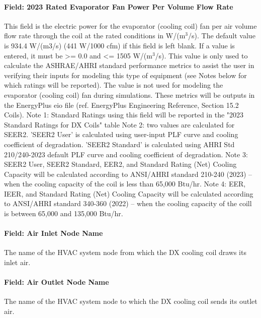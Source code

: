 \paragraph{Field: 2023 Rated Evaporator Fan Power Per Volume Flow Rate}

This field is the electric power for the evaporator (cooling coil) fan per air volume flow rate through the coil at the rated conditions in W/(m\(^{3}\)/s). The default value is 934.4 W/(m3/s) (441 W/1000 cfm) if this field is left blank. If a value is entered, it must be \textgreater{}= 0.0 and \textless{}= 1505 W/(m\(^{3}\)/s). This value is only used to calculate the ASHRAE/AHRI standard performance metrics to assist the user in verifying their inputs for modeling this type of equipment (see Notes below for which ratings will be reported).  The value is not used for modeling the evaporator (cooling coil) fan during simulations.  These metrics will be outputs in the EnergyPlus eio file (ref. EnergyPlus Engineering Reference, Section 15.2 Coils).
Note 1: Standard Ratings using this field will be reported in the "2023 Standard Ratings for DX Coils" table
Note 2: two values are calculated for SEER2. 'SEER2 User' is calculated using user-input PLF curve and cooling coefficient of degradation. 'SEER2 Standard' is calculated using AHRI Std 210/240-2023 default PLF curve and cooling coefficient of degradation.
Note 3: SEER2 User, SEER2 Standard, EER2, and Standard Rating (Net) Cooling Capacity will be calculated according to ANSI/AHRI standard 210-240 (2023) -- when the cooling capacity of the coil is less than 65,000 Btu/hr.
Note 4: EER, IEER, and Standard Rating (Net) Cooling Capacity will be calculated according to ANSI/AHRI standard 340-360 (2022) -- when the cooling capacity of the coill is between 65,000 and 135,000 Btu/hr.

\paragraph{Field: Air Inlet Node Name}\label{field-air-inlet-node-name-9}

The name of the HVAC system node from which the DX cooling coil draws its inlet air.

\paragraph{Field: Air Outlet Node Name}\label{field-air-outlet-node-name-9-000}

The name of the HVAC system node to which the DX cooling coil sends its outlet air.

